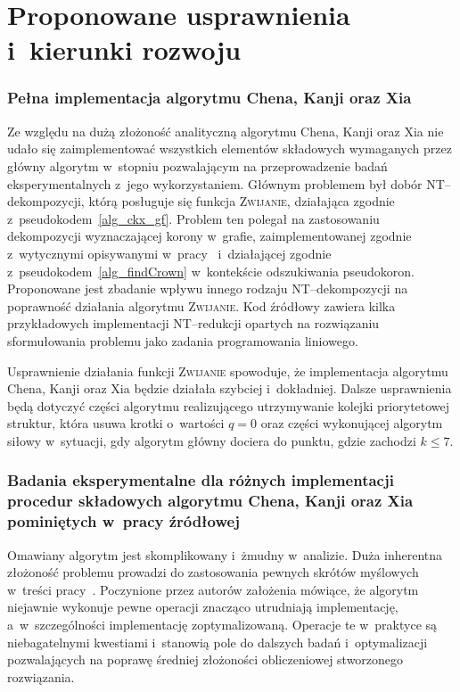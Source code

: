\section*{Proponowane usprawnienia i~kierunki rozwoju}\label{s_improvements}
\addtocounter{section}{1}
  \subsubsection{\textbf{Pełna implementacja algorytmu Chena, Kanji oraz Xia}}\label{sss_problems_ckx}

  Ze względu na dużą złożoność analityczną algorytmu Chena, Kanji oraz Xia nie udało się zaimplementować wszystkich elementów składowych wymaganych przez główny algorytm w~stopniu pozwalającym na przeprowadzenie badań eksperymentalnych z~jego wykorzystaniem.
  Głównym problemem był dobór NT--dekompozycji, którą posługuje się funkcja \textsc{Zwijanie}, działająca zgodnie z~pseudokodem~\ref{alg_ckx_gf}.
  Problem ten polegał na zastosowaniu dekompozycji wyznaczającej korony w~grafie, zaimplementowanej zgodnie z~wytycznymi opisywanymi w~pracy~\cite{KernelizationAlgorithms04} i~działającej zgodnie z~pseudokodem~\ref{alg_findCrown} w~kontekście odszukiwania pseudokoron.
  Proponowane jest zbadanie wpływu innego rodzaju NT--dekompozycji na poprawność działania algorytmu \textsc{Zwijanie}.
  Kod źródłowy zawiera kilka przykładowych implementacji NT--redukcji opartych na rozwiązaniu sformułowania problemu jako zadania programowania liniowego.

  Usprawnienie działania funkcji \textsc{Zwijanie} spowoduje, że implementacja algorytmu Chena, Kanji oraz Xia będzie działała szybciej i~dokładniej.
  Dalsze usprawnienia będą dotyczyć części algorytmu realizującego utrzymywanie kolejki priorytetowej struktur, która usuwa krotki o~wartości $q = 0$ oraz części wykonującej algorytm siłowy w~sytuacji, gdy algorytm główny dociera do punktu, gdzie zachodzi $k \leq 7$.

  \subsubsection{\textbf{Badania eksperymentalne dla różnych implementacji procedur składowych algorytmu Chena, Kanji oraz Xia pominiętych w~pracy źródłowej}}

  Omawiany algorytm jest skomplikowany i~żmudny w~analizie.
  Duża inherentna złożoność problemu prowadzi do zastosowania pewnych skrótów myślowych w~treści pracy~\cite{ImprovedBounds10}.
  Poczynione przez autorów założenia mówiące, że algorytm niejawnie wykonuje pewne operacji znacząco utrudniają implementację, a~w~szczególności implementację zoptymalizowaną.
  Operacje te w~praktyce są niebagatelnymi kwestiami i~stanowią pole do dalszych badań i~optymalizacji pozwalających na poprawę średniej złożoności obliczeniowej stworzonego rozwiązania.

